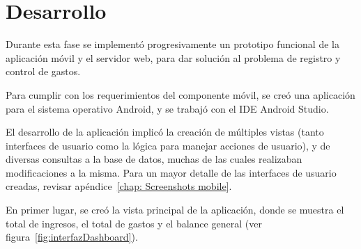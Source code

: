 \section{Desarrollo} \label{sect:desarrollo}

Durante esta fase se implementó progresivamente un prototipo funcional de la aplicación móvil y el servidor web, para dar solución al problema de registro y control de gastos. 

Para cumplir con los requerimientos del componente móvil, se creó una aplicación para el sistema operativo Android, y se trabajó con el IDE Android Studio. 

El desarrollo de la aplicación implicó la creación de múltiples vistas (tanto interfaces de usuario como la lógica para manejar acciones de usuario), y de diversas consultas a la base de datos, muchas de las cuales realizaban modificaciones a la misma. Para un mayor detalle de las interfaces de usuario creadas, revisar apéndice~\ref{chap: Screenshots mobile}.

En primer lugar, se creó la vista principal de la aplicación, donde se muestra el total de ingresos, el total de gastos y el balance general (ver figura~\ref{fig:interfazDashboard}).

